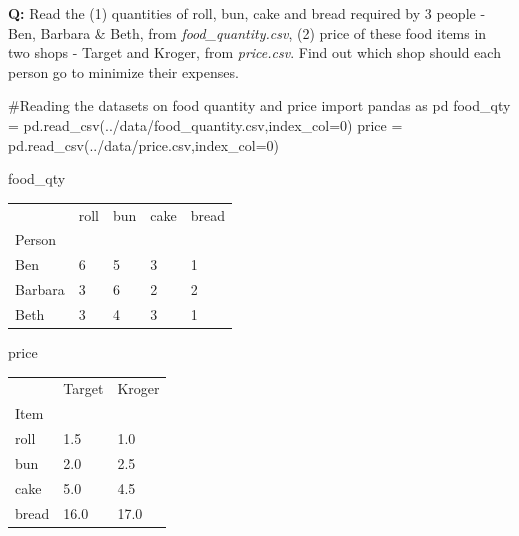 \documentclass[
  letterpaper,
  DIV=11,
  numbers=noendperiod]{scrreprt}
\newenvironment{Shaded}{\begin{snugshade}}{\end{snugshade}}
\newcommand{\CommentTok}[1]{\textcolor[rgb]{0.37,0.37,0.37}{#1}}
\newcommand{\DecValTok}[1]{\textcolor[rgb]{0.68,0.00,0.00}{#1}}
\newcommand{\ImportTok}[1]{\textcolor[rgb]{0.00,0.46,0.62}{#1}}
\newcommand{\NormalTok}[1]{\textcolor[rgb]{0.00,0.23,0.31}{#1}}
\newcommand{\OperatorTok}[1]{\textcolor[rgb]{0.37,0.37,0.37}{#1}}
\newcommand{\StringTok}[1]{\textcolor[rgb]{0.13,0.47,0.30}{#1}}
\begin{document}
\textbf{Q:} Read the (1) quantities of roll, bun, cake and bread
required by 3 people - Ben, Barbara \& Beth, from
\emph{food\_quantity.csv}, (2) price of these food items in two shops -
Target and Kroger, from \emph{price.csv}. Find out which shop should
each person go to minimize their expenses.

\begin{Shaded}
\begin{Highlighting}[]
\CommentTok{\#Reading the datasets on food quantity and price}
\ImportTok{import}\NormalTok{ pandas }\ImportTok{as}\NormalTok{ pd}
\NormalTok{food\_qty }\OperatorTok{=}\NormalTok{ pd.read\_csv(}\StringTok{\textquotesingle{}../data/food\_quantity.csv\textquotesingle{}}\NormalTok{,index\_col}\OperatorTok{=}\DecValTok{0}\NormalTok{)}
\NormalTok{price }\OperatorTok{=}\NormalTok{ pd.read\_csv(}\StringTok{\textquotesingle{}../data/price.csv\textquotesingle{}}\NormalTok{,index\_col}\OperatorTok{=}\DecValTok{0}\NormalTok{)}
\end{Highlighting}
\end{Shaded}

\begin{Shaded}
\begin{Highlighting}[]
\NormalTok{food\_qty}
\end{Highlighting}
\end{Shaded}

\begin{longtable}[]{@{}lllll@{}}
\toprule\noalign{}
& roll & bun & cake & bread \\
Person & & & & \\
\midrule\noalign{}
\endhead
\bottomrule\noalign{}
\endlastfoot
Ben & 6 & 5 & 3 & 1 \\
Barbara & 3 & 6 & 2 & 2 \\
Beth & 3 & 4 & 3 & 1 \\
\end{longtable}

\begin{Shaded}
\begin{Highlighting}[]
\NormalTok{price}
\end{Highlighting}
\end{Shaded}

\begin{longtable}[]{@{}lll@{}}
\toprule\noalign{}
& Target & Kroger \\
Item & & \\
\midrule\noalign{}
\endhead
\bottomrule\noalign{}
\endlastfoot
roll & 1.5 & 1.0 \\
bun & 2.0 & 2.5 \\
cake & 5.0 & 4.5 \\
bread & 16.0 & 17.0 \\
\end{longtable}
\end{document}
